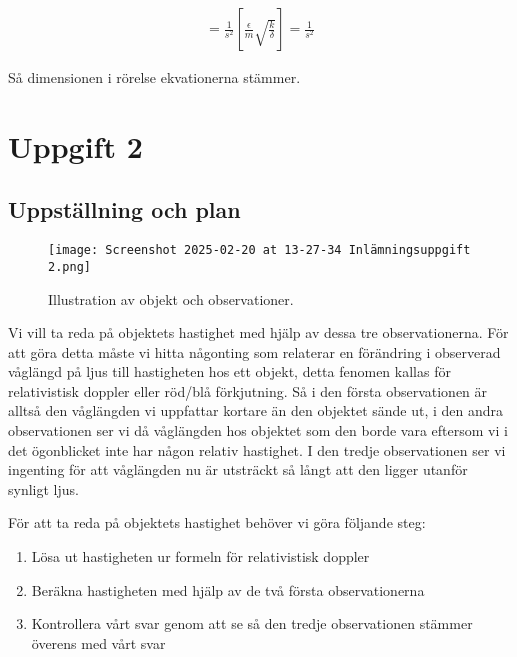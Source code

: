 \documentclass[a4paper]{article}
\begin{document}
\begin{align*}
    [\frac{k}{m}] = \frac{1}{s^2}
    [\frac{\epsilon}{m}\sqrt{\frac{k}{\delta}}] = \frac{1}{s^2}
\end{align*}

Så dimensionen i rörelse ekvationerna stämmer.
\section{Uppgift 2}

\subsection{Uppställning och plan}
\begin{figure}[H]
    \begin{small}
        \begin{center}
            \texttt{[image: Screenshot 2025-02-20 at 13-27-34 Inlämningsuppgift 2.png]}
        \end{center}
        \caption{Illustration av objekt och observationer.}
        \label{fig:2}
    \end{small}
\end{figure}

Vi vill ta reda på objektets hastighet med hjälp av dessa tre observationerna. För att göra detta måste vi hitta någonting som relaterar en förändring i observerad våglängd på ljus till hastigheten hos ett objekt, detta fenomen kallas för relativistisk doppler eller röd/blå förkjutning. Så i den första observationen är alltså den våglängden vi uppfattar kortare än den objektet sände ut, i den andra observationen ser vi då våglängden hos objektet som den borde vara eftersom vi i det ögonblicket inte har någon relativ hastighet. I den tredje observationen ser vi ingenting för att våglängden nu är utsträckt så långt att den ligger utanför synligt ljus. 

För att ta reda på objektets hastighet behöver vi göra följande steg:

\begin{enumerate}
    \item Lösa ut hastigheten ur formeln för relativistisk doppler
    \item Beräkna hastigheten med hjälp av de två första observationerna
    \item Kontrollera vårt svar genom att se så den tredje observationen stämmer överens med vårt svar
\end{enumerate}
\end{document}
